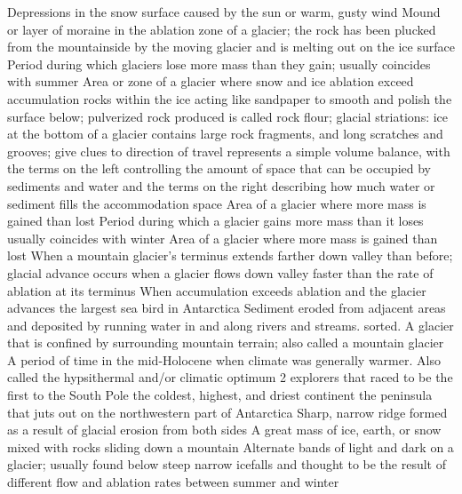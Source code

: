 
\pagebreak
{} Depressions in the snow surface caused by the sun or warm, gusty wind
 Mound or layer of moraine in the ablation zone of a glacier; the rock has been plucked from the mountainside by the moving glacier and is melting out on the ice surface
 Period during which glaciers lose more mass than they gain; usually coincides with summer
 Area or zone of a glacier where snow and ice ablation exceed accumulation
 rocks within the ice acting like sandpaper to smooth and polish the surface below; pulverized rock produced is called rock flour; glacial striations: ice at the bottom of a glacier contains large rock fragments, and long scratches and grooves; give clues to direction of travel
 represents a simple volume balance, with the terms on the left controlling the amount of space that can be occupied by sediments and water and the terms on the right describing how much water or sediment fills the accommodation space
 Area of a glacier where more mass is gained than lost
 Period during which a glacier gains more mass than it loses usually coincides with winter
 Area of a glacier where more mass is gained than lost
 When a mountain glacier's terminus extends farther down valley than before; glacial advance occurs when a glacier flows down valley faster than the rate of ablation at its terminus
 When accumulation exceeds ablation and the glacier advances
 the largest sea bird in Antarctica
 Sediment eroded from adjacent areas and deposited by running water in and along rivers and streams. sorted.
 A glacier that is confined by surrounding mountain terrain; also called a mountain glacier
 A period of time in the mid-Holocene when climate was generally warmer. Also called the hypsithermal and/or climatic optimum
 2 explorers that raced to be the first to the South Pole
 the coldest, highest, and driest continent
 the peninsula that juts out on the northwestern part of Antarctica
 Sharp, narrow ridge formed as a result of glacial erosion from both sides
 A great mass of ice, earth, or snow mixed with rocks sliding down a mountain
 Alternate bands of light and dark on a glacier; usually found below steep narrow icefalls and thought to be the result of different flow and ablation rates between summer and winter
